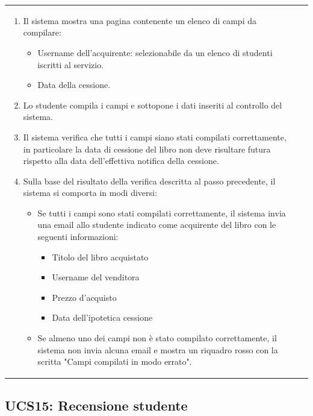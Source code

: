 \documentclass[10pt,a4paper]{report}
\begin{document}
\begin{tabular}{lp{}}
\begin{enumerate}
			
			\item Il sistema mostra una pagina contenente un elenco di campi da compilare:
			\begin{itemize}
				\item Username dell'acquirente: selezionabile da un elenco di studenti iscritti al servizio.
				\item Data della cessione.
			\end{itemize}
			\item Lo studente compila i campi e sottopone i dati inseriti al controllo del sistema.
			\item Il sistema verifica che tutti i campi siano stati compilati correttamente, in particolare la data di cessione del libro non deve risultare futura rispetto alla data dell'effettiva notifica della cessione.
			\item Sulla base del risultato della verifica descritta al passo precedente, il sistema si comporta in modi diversi:
			\begin{itemize}
				\item Se tutti i campi sono stati compilati correttamente, il sistema invia una email allo studente indicato come acquirente del libro con le seguenti informazioni:
				\begin{itemize}
					\item Titolo del libro acquistato
					\item Username del venditora
					\item Prezzo d'acquisto
					\item Data dell'ipotetica cessione
				\end{itemize}
				\item Se almeno uno dei campi non è stato compilato correttamente, il sistema non invia alcuna email e mostra un riquadro rosso con la scritta "Campi compilati in modo errato".
			\end{itemize}
		\end{enumerate}
	\end{tabular}

	\subsection{UCS15: Recensione studente}
\end{document}
